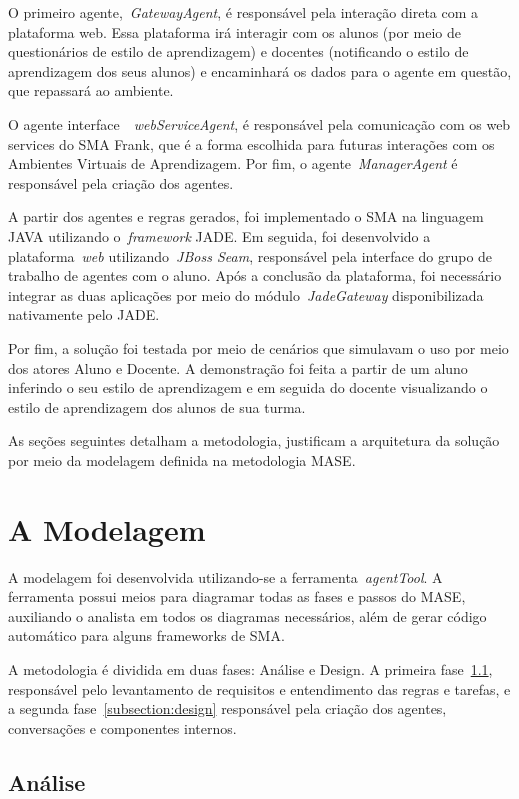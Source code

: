 O primeiro agente,~\emph{GatewayAgent}, é responsável pela interação direta com a plataforma web. Essa plataforma irá interagir com os alunos (por meio de questionários de estilo de aprendizagem) e docentes (notificando o estilo de aprendizagem dos seus alunos) e encaminhará os dados para o agente em questão, que repassará ao ambiente.

O agente interface~\emph{~\emph{web}ServiceAgent}, é responsável pela comunicação com os web services do SMA Frank, que é a forma escolhida para futuras interações com os Ambientes Virtuais de Aprendizagem. Por fim, o agente~\emph{ManagerAgent} é responsável pela criação dos agentes.

A partir dos agentes e regras gerados, foi implementado o SMA na linguagem JAVA utilizando o~\emph{framework} JADE. Em seguida, foi desenvolvido a plataforma~\emph{web} utilizando~\emph{JBoss Seam}, responsável pela interface do grupo de trabalho de agentes com o aluno. Após a conclusão da plataforma, foi necessário integrar as duas aplicações por meio do módulo~\emph{JadeGateway} disponibilizada nativamente pelo JADE.

Por fim, a solução foi testada por meio de cenários que simulavam o uso por meio dos atores Aluno e Docente. A demonstração foi feita a partir de um aluno inferindo o seu estilo de aprendizagem e em seguida do docente visualizando o estilo de aprendizagem dos alunos de sua turma.

As seções seguintes detalham a metodologia, justificam a arquitetura da solução por meio da modelagem definida na metodologia MASE.

\section{A Modelagem}\label{section:modelagem}

A modelagem foi desenvolvida utilizando-se a ferramenta~\emph{agentTool}. A ferramenta possui meios para diagramar todas as fases e passos do MASE, auxiliando o analista em todos os diagramas necessários, além de gerar código automático para alguns frameworks de SMA.

A metodologia é dividida em duas fases: Análise e Design. A primeira fase~\ref{subsection:analise}, responsável pelo levantamento de requisitos e entendimento das regras e tarefas, e a segunda fase~\ref{subsection:design} responsável pela criação dos agentes, conversações e componentes internos.

\subsection{Análise}\label{subsection:analise}

